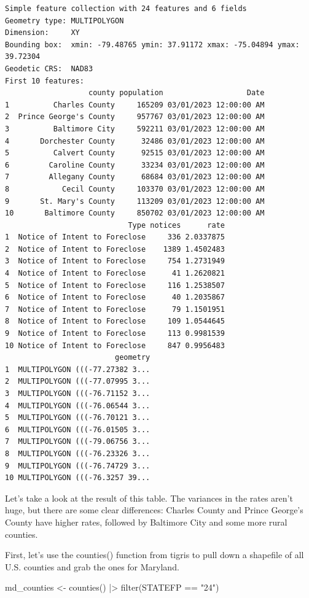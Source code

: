 \documentclass[
  letterpaper,
  DIV=11,
  numbers=noendperiod]{scrreprt}
\newenvironment{Shaded}{\begin{snugshade}}{\end{snugshade}}
\newcommand{\FunctionTok}[1]{\textcolor[rgb]{0.28,0.35,0.67}{#1}}
\newcommand{\NormalTok}[1]{\textcolor[rgb]{0.00,0.23,0.31}{#1}}
\newcommand{\OtherTok}[1]{\textcolor[rgb]{0.00,0.23,0.31}{#1}}
\newcommand{\SpecialCharTok}[1]{\textcolor[rgb]{0.37,0.37,0.37}{#1}}
\newcommand{\StringTok}[1]{\textcolor[rgb]{0.13,0.47,0.30}{#1}}
\begin{document}
\begin{verbatim}
Simple feature collection with 24 features and 6 fields
Geometry type: MULTIPOLYGON
Dimension:     XY
Bounding box:  xmin: -79.48765 ymin: 37.91172 xmax: -75.04894 ymax: 39.72304
Geodetic CRS:  NAD83
First 10 features:
                   county population                   Date
1          Charles County     165209 03/01/2023 12:00:00 AM
2  Prince George's County     957767 03/01/2023 12:00:00 AM
3          Baltimore City     592211 03/01/2023 12:00:00 AM
4       Dorchester County      32486 03/01/2023 12:00:00 AM
5          Calvert County      92515 03/01/2023 12:00:00 AM
6         Caroline County      33234 03/01/2023 12:00:00 AM
7         Allegany County      68684 03/01/2023 12:00:00 AM
8            Cecil County     103370 03/01/2023 12:00:00 AM
9       St. Mary's County     113209 03/01/2023 12:00:00 AM
10       Baltimore County     850702 03/01/2023 12:00:00 AM
                            Type notices      rate
1  Notice of Intent to Foreclose     336 2.0337875
2  Notice of Intent to Foreclose    1389 1.4502483
3  Notice of Intent to Foreclose     754 1.2731949
4  Notice of Intent to Foreclose      41 1.2620821
5  Notice of Intent to Foreclose     116 1.2538507
6  Notice of Intent to Foreclose      40 1.2035867
7  Notice of Intent to Foreclose      79 1.1501951
8  Notice of Intent to Foreclose     109 1.0544645
9  Notice of Intent to Foreclose     113 0.9981539
10 Notice of Intent to Foreclose     847 0.9956483
                         geometry
1  MULTIPOLYGON (((-77.27382 3...
2  MULTIPOLYGON (((-77.07995 3...
3  MULTIPOLYGON (((-76.71152 3...
4  MULTIPOLYGON (((-76.06544 3...
5  MULTIPOLYGON (((-76.70121 3...
6  MULTIPOLYGON (((-76.01505 3...
7  MULTIPOLYGON (((-79.06756 3...
8  MULTIPOLYGON (((-76.23326 3...
9  MULTIPOLYGON (((-76.74729 3...
10 MULTIPOLYGON (((-76.3257 39...
\end{verbatim}

Let's take a look at the result of this table. The variances in the
rates aren't huge, but there are some clear differences: Charles County
and Prince George's County have higher rates, followed by Baltimore City
and some more rural counties.

First, let's use the counties() function from tigris to pull down a
shapefile of all U.S. counties and grab the ones for Maryland.

\begin{Shaded}
\begin{Highlighting}[]
\NormalTok{md\_counties }\OtherTok{\textless{}{-}} \FunctionTok{counties}\NormalTok{() }\SpecialCharTok{|\textgreater{}}
  \FunctionTok{filter}\NormalTok{(STATEFP }\SpecialCharTok{==} \StringTok{"24"}\NormalTok{)}
\end{Highlighting}
\end{Shaded}
\end{document}
